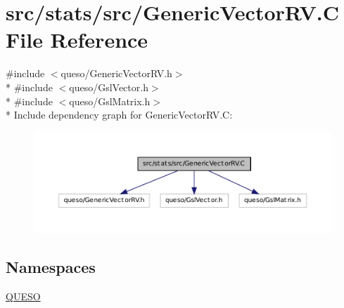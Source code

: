 \hypertarget{_generic_vector_r_v_8_c}{\section{src/stats/src/\-Generic\-Vector\-R\-V.C File Reference}
\label{_generic_vector_r_v_8_c}
}
{\ttfamily \#include $<$queso/\-Generic\-Vector\-R\-V.\-h$>$}\\*
{\ttfamily \#include $<$queso/\-Gsl\-Vector.\-h$>$}\\*
{\ttfamily \#include $<$queso/\-Gsl\-Matrix.\-h$>$}\\*
Include dependency graph for Generic\-Vector\-R\-V.\-C\-:
\nopagebreak
\begin{figure}[H]
\begin{center}
\leavevmode
\includegraphics[width=350pt]{_generic_vector_r_v_8_c__incl}
\end{center}
\end{figure}
\subsection*{Namespaces}
\begin{DoxyCompactItemize}
\item 
\hyperlink{namespace_q_u_e_s_o}{Q\-U\-E\-S\-O}
\end{DoxyCompactItemize}
